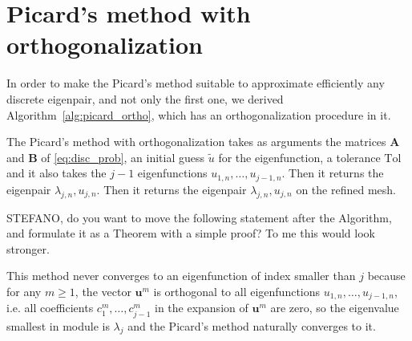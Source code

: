 \documentclass[preprint,12pt]{elsarticle}
\begin{document}

\section{Picard's method with orthogonalization}\label{sec:picard++}

In order to make the Picard's method suitable to approximate efficiently any discrete eigenpair, and not only the first one, we derived Algorithm~\ref{alg:picard_ortho}, which has an orthogonalization procedure in it.

The Picard's method with orthogonalization takes as arguments the matrices $\mathbf{A}$ and $\mathbf{B}$ of \eqref{eq:disc_prob}, an initial guess $\tilde u$ for the eigenfunction, a tolerance $\mathrm{Tol}$ and it also takes the $j-1$ eigenfunctions $u_{1,n},\dots,u_{j-1,n}$.
Then it returns the eigenpair $\lambda_{j,n},u_{j,n}$. 
Then it returns the eigenpair $\lambda_{j,n},u_{j,n}$ on the refined mesh.

{\red STEFANO, do you want to move the following statement after the Algorithm, 
and formulate it as a Theorem with 
a simple proof? To me this would look stronger.}

This method never converges to an eigenfunction of index smaller than $j$ because for any $m\ge 1$, the vector $\mathbf{u}^m$ is orthogonal to all eigenfunctions $u_{1,n},\dots,u_{j-1,n}$, i.e. all coefficients 
$c_1^m,\dots,c_{j-1}^m$ in the expansion of $\mathbf{u}^m$ are zero, so the eigenvalue smallest in module is $\lambda_j$ and the Picard's method naturally converges to it.


\end{document}
